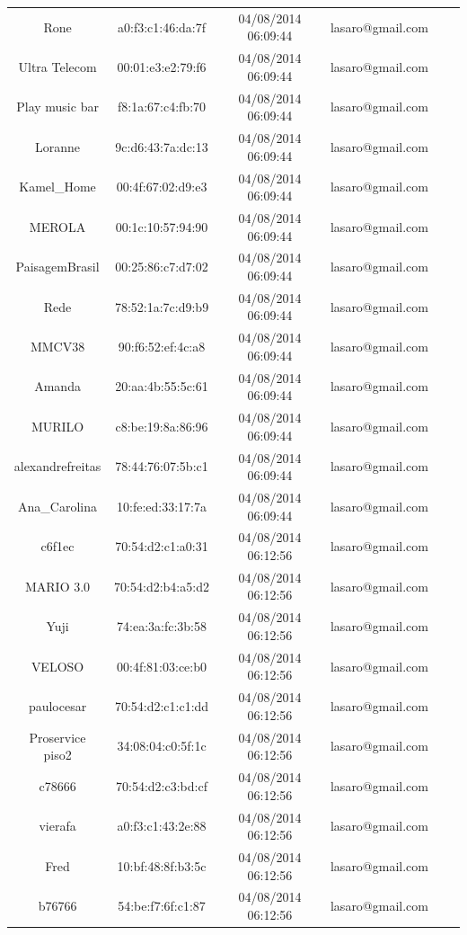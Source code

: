 \documentclass[12pt, %
openright, 
oneside,
a4paper,
brazil]{facom-ufu-abntex2}
\begin{document}
\begin{center}
\begin{longtable}{|c|c|c|c|c|c|}
Rone & a0:f3:c1:46:da:7f & 04/08/2014 06:09:44 & lasaro@gmail.com \\
Ultra Telecom & 00:01:e3:e2:79:f6 & 04/08/2014 06:09:44 & lasaro@gmail.com \\
Play music bar & f8:1a:67:c4:fb:70 & 04/08/2014 06:09:44 & lasaro@gmail.com \\
Loranne & 9c:d6:43:7a:dc:13 & 04/08/2014 06:09:44 & lasaro@gmail.com \\
Kamel\_Home & 00:4f:67:02:d9:e3 & 04/08/2014 06:09:44 & lasaro@gmail.com \\
MEROLA & 00:1c:10:57:94:90 & 04/08/2014 06:09:44 & lasaro@gmail.com \\
PaisagemBrasil & 00:25:86:c7:d7:02 & 04/08/2014 06:09:44 & lasaro@gmail.com \\
Rede & 78:52:1a:7c:d9:b9 & 04/08/2014 06:09:44 & lasaro@gmail.com \\
MMCV38 & 90:f6:52:ef:4c:a8 & 04/08/2014 06:09:44 & lasaro@gmail.com \\
Amanda & 20:aa:4b:55:5c:61 & 04/08/2014 06:09:44 & lasaro@gmail.com \\
MURILO & c8:be:19:8a:86:96 & 04/08/2014 06:09:44 & lasaro@gmail.com \\
alexandrefreitas & 78:44:76:07:5b:c1 & 04/08/2014 06:09:44 & lasaro@gmail.com \\
Ana\_Carolina & 10:fe:ed:33:17:7a & 04/08/2014 06:09:44 & lasaro@gmail.com \\
c6f1ec & 70:54:d2:c1:a0:31 & 04/08/2014 06:12:56 & lasaro@gmail.com \\
MARIO 3.0 & 70:54:d2:b4:a5:d2 & 04/08/2014 06:12:56 & lasaro@gmail.com \\
Yuji & 74:ea:3a:fc:3b:58 & 04/08/2014 06:12:56 & lasaro@gmail.com \\
VELOSO & 00:4f:81:03:ce:b0 & 04/08/2014 06:12:56 & lasaro@gmail.com \\
paulocesar & 70:54:d2:c1:c1:dd & 04/08/2014 06:12:56 & lasaro@gmail.com \\
Proservice piso2 & 34:08:04:c0:5f:1c & 04/08/2014 06:12:56 & lasaro@gmail.com \\
c78666 & 70:54:d2:c3:bd:cf & 04/08/2014 06:12:56 & lasaro@gmail.com \\
vierafa & a0:f3:c1:43:2e:88 & 04/08/2014 06:12:56 & lasaro@gmail.com \\
Fred & 10:bf:48:8f:b3:5c & 04/08/2014 06:12:56 & lasaro@gmail.com \\
b76766 & 54:be:f7:6f:c1:87 & 04/08/2014 06:12:56 & lasaro@gmail.com \\

\end{longtable}
\end{center}
\end{document}
